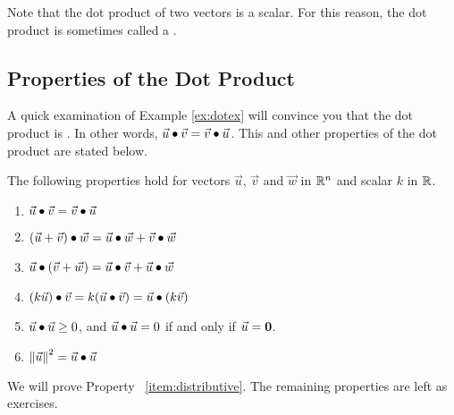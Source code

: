 \documentclass{ximera}
\begin{document}
Note that the dot product of two vectors is a scalar.  For this reason, the dot product is sometimes called a .
 
\subsection*{Properties of the Dot Product}
 
A quick examination of Example \ref{ex:dotex} will convince you that the dot product is . In other words, $\vec{u}\bullet\vec{v}=\vec{v}\bullet\vec{u}$.  This and other properties of the dot product are stated below.
 
\begin{theorem}\label{th:dotproductproperties} The following properties hold for
  vectors $\vec{u}$, $\vec{v}$ and $\vec{w}$ in $\mathbb{R}^n$ and scalar
  $k$ in $\mathbb{R}$.
  \begin{enumerate}
  \item\label{item:commutative}
    $\vec{u}\bullet\vec{v}=\vec{v}\bullet\vec{u}$
    
  \item\label{item:distributive} $(\vec{u}+\vec{v})\bullet \vec{w}=\vec{u}\bullet \vec{w}+\vec{v}\bullet \vec{w}$
    
  \item\label{item:distributive-again} $\vec{u}\bullet (\vec{v}+\vec{w})=\vec{u}\bullet\vec{v}+\vec{u}\bullet \vec{w}$
    
  \item\label{item:scalar} $(k\vec{u})\bullet \vec{v}=k(\vec{u}\bullet\vec{v})=\vec{u}\bullet (k\vec{v})$
    
  \item \label{item:positive} $\vec{u}\bullet\vec{u}\geq 0$, and $\vec{u}\bullet\vec{u}=0$ if and only if $\vec{u}={\bf 0}$.
    
  \item \label{item:norm}
    $\left\|\vec{u}\right\|^2=\vec{u}\bullet\vec{u}$
  \end{enumerate}
\end{theorem}
 
We will prove Property ~\ref{item:distributive}.  The remaining properties are left as exercises.
 
\end{document}
